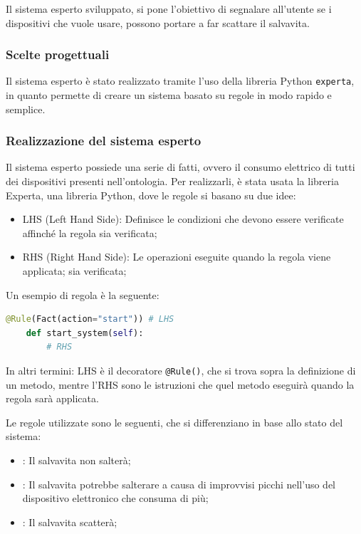 \documentclass[12pt, letterpaper]{article}
\begin{document}
\noindent Il sistema esperto sviluppato, si pone l'obiettivo di segnalare all'utente
se i dispositivi che vuole usare, possono portare a far scattare il salvavita. \\

\subsubsection{Scelte progettuali}

Il sistema esperto è stato realizzato tramite l'uso della libreria Python \texttt{experta}, in
quanto permette di creare un sistema basato su regole in modo rapido e semplice.

\subsubsection{Realizzazione del sistema esperto}

Il sistema esperto possiede una serie di fatti, ovvero il consumo elettrico di tutti dei dispositivi
presenti nell'ontologia. Per realizzarli, è stata usata la libreria Experta, una libreria Python, dove le regole
si basano su due idee:

\begin{itemize}
      \item LHS (Left Hand Side): Definisce le condizioni che devono essere verificate affinché la regola
            sia verificata;
      \item RHS (Right Hand Side): Le operazioni eseguite quando la regola viene applicata;
            sia verificata;
\end{itemize}

\noindent Un esempio di regola è la seguente:

\begin{lstlisting}[language=Python]
    @Rule(Fact(action="start")) # LHS
    def start_system(self):
        # RHS
\end{lstlisting}

\noindent In altri termini: LHS è il decoratore \texttt{@Rule()}, che si trova
sopra la definizione di un metodo, mentre l'RHS sono le istruzioni che quel metodo
eseguirà quando la regola sarà applicata.

\noindent Le regole utilizzate sono le seguenti, che si differenziano in base allo stato
del sistema:

\begin{itemize}
      \item {}: Il salvavita non salterà;
      \item {}: Il salvavita potrebbe salterare a causa di improvvisi
            picchi nell'uso del dispositivo elettronico che consuma di più;
      \item {}: Il salvavita scatterà;
\end{itemize}
\end{document}

